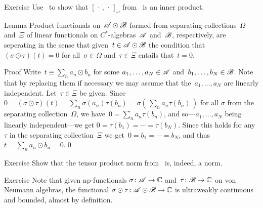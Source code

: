 \documentclass[a]{subfiles}
\begin{document}
\begin{parsec}
\begin{point}{Exercise}
Use~ 
to show that
 $[\,\cdot\,,\,\cdot\,]_\omega$
from~
is an inner product.
\end{point}
\begin{point}{Lemma}%
Product functionals on~$\mathscr{A}\odot\mathscr{B}$
formed from 
separating
collections~$\Omega$ and~$\Xi$ 
of linear functionals
on $C^*$-algebras~$\mathscr{A}$ and~$\mathscr{B}$,
respectively,
are seperating
in the sense that given~$t\in\mathscr{A}\odot\mathscr{B}$
the condition that $(\sigma\odot \tau)(t)=0$
for all~$\sigma\in \Omega$ and~$\tau\in\Xi$
entails that~$t=0$.
\begin{point}{Proof}%
Write~$t\equiv \sum_n a_n\odot b_n$
for some  $a_1,\dotsc,a_N\in\mathscr{A}$
and~$b_1,\dotsc,b_N\in \mathscr{B}$.
Note that by replacing them if necessary
we may assume that the~$a_1,\dotsc,a_N$
are linearly independent.
Let~$\tau\in\Xi$ be given.
Since~$0=(\sigma\odot \tau)(t)
= \sum_n\sigma(a_n)\tau(b_n)
= \sigma(\,\sum_n a_n\tau(b_n)\,)$
for all $\sigma$ from the separating collection~$\Omega$,
we have~$0=\sum_n a_n\tau(b_n)$,
and so---$a_1,\dotsc,a_N$ being linearly independent---we get
 $0=\tau(b_1)=\dotsb = \tau(b_N)$.
Since this holds for any~$\tau$
in the separating collection~$\Xi$
we get~$0=b_1=\dotsb=b_N$,
and thus~$t=\sum_n a_n\odot b_n=0$.\qed
\end{point}
\end{point}
\begin{point}{Exercise}%
Show that the tensor product norm
from~
is, indeed, a norm.
\end{point}
\begin{point}{Exercise}%
Note that given np-functionals 
$\sigma \colon \mathscr{A}\to\mathbb{C}$
and~$\tau\colon \mathscr{B}\to\mathbb{C}$
on von Neumann algebras,
the functional $\sigma\odot\tau\colon \mathscr{A}\odot\mathscr{B}\to\mathbb{C}$
is ultraweakly continuous and bounded,
almost by definition.


\end{point}
\end{parsec}
\end{document}
